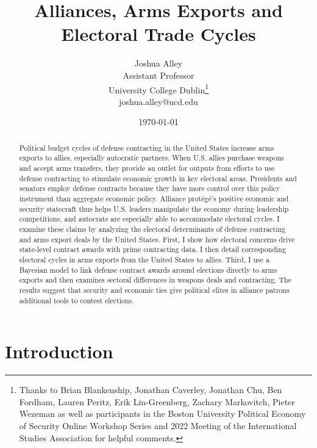 \documentclass[12pt]{article}
\title{\textbf{Alliances, Arms Exports and Electoral Trade Cycles}}
\author{Joshua Alley \\
Assistant Professor \\
University College Dublin\thanks{Thanks to Brian Blankenship, Jonathan Caverley, Jonathan Chu, Ben Fordham, Lauren Peritz, Erik Lin-Greenberg, Zachary Markovitch, Pieter Wezeman as well as participants in the Boston University Political Economy of Security Online Workshop Series and 2022 Meeting of the International Studies Association for helpful comments.} \\
joshua.alley@ucd.edu
}
\date{\today}
\begin{document}
\maketitle 

\begin{abstract} 
Political budget cycles of defense contracting in the United States increase arms exports to allies, especially autocratic partners.  
When U.S. allies purchase weapons and accept arms transfers, they provide an outlet for outputs from efforts to use defense contracting to stimulate economic growth in key electoral areas.
Presidents and senators employ defense contracts because they have more control over this policy instrument than aggregate economic policy.
Alliance prot{\'e}g{\'e}'s positive economic and security statecraft thus helps U.S. leaders manipulate the economy during leadership competitions, and autocrats are especially able to accommodate electoral cycles.   
I examine these claims by analyzing the electoral determinants of defense contracting and arms export deals by the United States. 
First, I show how electoral concerns drive state-level contract awards with prime contracting data. 
I then detail corresponding electoral cycles in arms exports from the United States to allies. 
Third, I use a Bayesian model to link defense contract awards around elections directly to arms exports and then examines sectoral differences in weapons deals and contracting.
The results suggest that security and economic ties give political elites in alliance patrons additional tools to contest elections. 
\end{abstract} 


\newpage 
\doublespace 


\section{Introduction}


%
%
\end{document}
